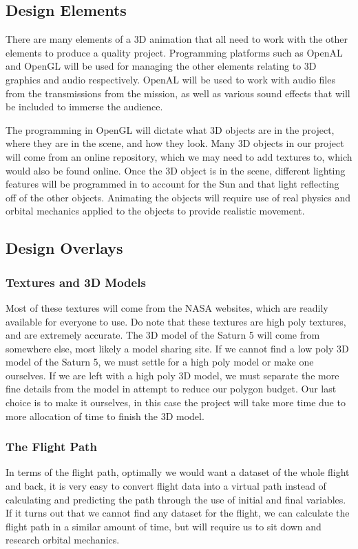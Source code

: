 \documentclass[onecolumn, draftclsnofoot,10pt, compsoc]{IEEEtran}
\begin{document}
    \subsection{Design Elements}
    There are many elements of a 3D animation that all need to work with the other elements to produce a quality project. Programming platforms such as OpenAL and OpenGL will be used for managing the other elements relating to 3D graphics and audio respectively. OpenAL will be used to work with audio files from the transmissions from the mission, as well as various sound effects that will be included to immerse the audience. 
    
    The programming in OpenGL will dictate what 3D objects are in the project, where they are in the scene, and how they look. Many 3D objects in our project will come from an online repository, which we may need to add textures to, which would also be found online. Once the 3D object is in the scene, different lighting features will be programmed in to account for the Sun and that light reflecting off of the other objects. Animating the objects will require use of real physics and orbital mechanics applied to the objects to provide realistic movement. 

    \subsection{Design Overlays} %
	
	\subsubsection{Textures and 3D Models}
	Most of these textures will come from the NASA websites, which are readily available for everyone to use. Do note that these textures are high poly textures, and are extremely accurate. The 3D model of the Saturn 5 will come from somewhere else, most likely a model sharing site. If we cannot find a low poly 3D model of the Saturn 5, we must settle for a high poly model or make one ourselves. If we are left with a high poly 3D model, we must separate the more fine details from the model in attempt to reduce our polygon budget. Our last choice is to make it ourselves, in this case the project will take more time due to more allocation of time to finish the 3D model.
	
	\subsubsection{The Flight Path}
	In terms of the flight path, optimally we would want a dataset of the whole flight and back, it is very easy to convert flight data into a virtual path instead of calculating and predicting the path through the use of initial and final variables. If it turns out that we cannot find any dataset for the flight, we can calculate the flight path in a similar amount of time, but will require us to sit down and research orbital mechanics. 
	
\end{document}
